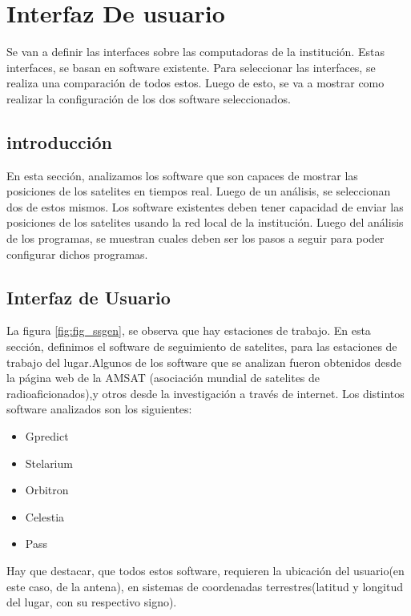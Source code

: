 \graphicspath{{parte_2/Interfaz de usuario}}

\renewcommand{\chaptername}{interfaz de usuario}

\chapter{Interfaz De usuario} %
\begin{center}
	\begin{tcolorbox}[colback=gray!5!white, %
		colframe=blue!75!black,
		title= \center{\Large{resumen}} ]
		Se van a definir las interfaces sobre las computadoras de la institución. Estas interfaces, se basan en software existente. Para seleccionar las interfaces, se realiza una comparación de todos estos. Luego de esto, se va a mostrar como realizar la configuración de los dos software seleccionados.   
	\end{tcolorbox}
\end{center}    



\section{introducción}
En esta sección, analizamos los software que son capaces de mostrar las posiciones de los satelites en tiempos real. Luego de un análisis, se seleccionan dos de estos mismos. Los software existentes deben tener capacidad de enviar las posiciones de los satelites usando la red local de la institución. Luego del análisis de los programas, se muestran cuales deben ser los pasos a seguir para poder configurar dichos programas.  

\section{Interfaz de Usuario}

La figura \ref{fig:fig_ssgen}, se observa que hay estaciones de trabajo. En esta sección, definimos el software de seguimiento de satelites, para las estaciones de trabajo del lugar.Algunos de los software que se analizan fueron obtenidos desde la página web de la AMSAT (asociación mundial de satelites de radioaficionados),y otros desde la investigación a través de internet. 
Los distintos software analizados son los siguientes: 
\begin{itemize}
	\item Gpredict 
	\item Stelarium 
	\item Orbitron 
	\item Celestia 
	\item Pass 
\end{itemize}
Hay que destacar, que todos estos software, requieren la ubicación del usuario(en este caso, de la antena), en sistemas de coordenadas terrestres(latitud y longitud del lugar, con su respectivo signo). 


